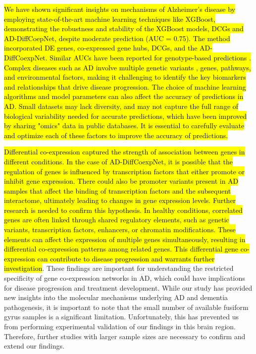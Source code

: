 \documentclass[utf8]{FrontiersinHarvard} %
\begin{document}
\hl{We have shown significant insights on mechanisms of Alzheimer's disease by employing state-of-the-art machine learning techniques like XGBoost, demonstrating the robustness and stability of the XGBoost models, DCGs and AD-DiffCoepNet, despite moderate prediction (AUC = 0.75). The method incorporated DE genes, co-expressed gene hubs, DCGs, and the AD-DiffCoexpNet. Similar AUCs have been reported for genotype-based predictions \citep{randomforestapp, randomforestapp2}. Complex diseases such as AD involve multiple genetic variants \citep{bellenguez2022new}, genes, pathways, and environmental factors, making it challenging to identify the key biomarkers and relationships that drive disease progression. The choice of machine learning algorithms and model parameters can also affect the accuracy of predictions in AD. Small datasets may lack diversity, and may not capture the full range of biological variability needed for accurate predictions, which have been improved by sharing "omics" data in public databases. It is essential to carefully evaluate and optimize each of these factors to improve the accuracy of predictions.}

\hl{Differential co-expression captured the strength of association between genes in different conditions. In the case of AD-DiffCoexpNet, it is possible that the regulation of genes is influenced by transcription factors that either promote or inhibit gene expression. There could also be promoter variants present in AD samples that affect the binding of transcription factors and the subsequent interactome, ultimately leading to changes in gene expression levels. Further research is needed to confirm this hypothesis. In healthy conditions, correlated genes are often linked through shared regulatory elements, such as genetic variants, transcription factors, enhancers, or chromatin modifications. These elements can affect the expression of multiple genes simultaneously, resulting in differential co-expression patterns among related genes. This differential gene co-expression can contribute to disease progression and warrants further investigation}. These findings are important for understanding the restricted specificity of gene co-expression networks in AD, which could have implications for disease progression and treatment development. While our study has provided new insights into the molecular mechanisms underlying AD and dementia pathogenesis, it is important to note that the small number of available fusiform gyrus samples is a significant limitation. Unfortunately, this has prevented us from performing experimental validation of our findings in this brain region. Therefore, further studies with larger sample sizes are necessary to confirm and extend our findings.
\end{document}
